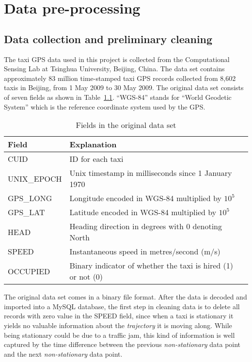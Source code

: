 \chapter{Data pre-processing}
\section{Data collection and preliminary cleaning}
The taxi GPS data used in this project is collected from the Computational Sensing Lab\cite{BPLL13} at Tsinghua University, Beijing, China. The data set contains approximately 83 million time-stamped taxi GPS records collected from 8,602 taxis in Beijing, from 1 May 2009 to 30 May 2009. The original data set consists of seven fields as shown in Table~\ref{Ta:orig_field}. ``WGS-84'' stands for ``World Geodetic System'' which is the reference coordinate system used by the GPS.

\begin{table}
\centering
\begin{tabular}{ | l | l | l | }
\hline
\textbf{Field} & \textbf{Explanation} \\ \hline
CUID & ID for each taxi \\ \hline
UNIX\_EPOCH & Unix timestamp in milliseconds since 1 January 1970\\ \hline
GPS\_LONG & Longitude encoded in WGS-84 multiplied by $10^{5}$\\ \hline
GPS\_LAT & Latitude encoded in WGS-84 multiplied by $10^{5}$ \\ \hline
HEAD & Heading direction in degrees with 0 denoting North\\ \hline
SPEED & Instantaneous speed in metres/second (m/s)\\ \hline
OCCUPIED & Binary indicator of whether the taxi is hired (1) or not (0)\\ \hline
\end{tabular}
\caption{Fields in the original data set}\label{Ta:orig_field}
\end{table}

The original data set comes in a binary file format. After the data is decoded and imported into a MySQL database, the first step in cleaning data is to delete all records with zero value in the SPEED field, since when a taxi is stationary it yields no valuable information about the \emph{trajectory} it is moving along. While being stationary could be due to a traffic jam, this kind of information is well captured by the time difference between the previous \emph{non-stationary} data point and the next \emph{non-stationary} data point. 

